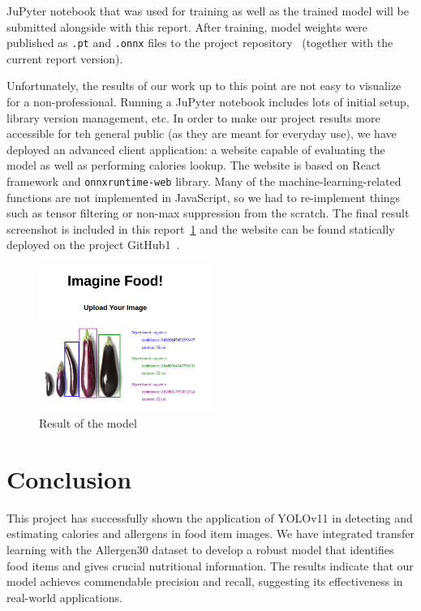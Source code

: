 \documentclass[10pt,twocolumn,letterpaper]{article}
\begin{document}
JuPyter notebook that was used for training as well as the trained model will be submitted alongside with this report.
After training, model weights were published as \texttt{.pt} and \texttt{.onnx} files to the project repository~\cite{projectRepo} (together with the current report version).

Unfortunately, the results of our work up to this point are not easy to visualize for a non-professional.
Running a JuPyter notebook includes lots of initial setup, library version management, etc.
In order to make our project results more accessible for teh general public (as they are meant for everyday use), we have deployed an advanced client application: a website capable of evaluating the model as well as performing calories lookup.
The website is based on React framework and \texttt{onnxruntime-web} library.
Many of the machine-learning-related functions are not implemented in JavaScript, so we had to re-implement things such as tensor filtering or non-max suppression from the scratch.
The final result screenshot is included in this report~\ref{advanced-client-result} and the website can be found statically deployed on the project GitHub1~\cite{projectWebsite}.

\begin{figure}[htbp]
    \centering
    \includegraphics[width=0.5\textwidth]{advanced-detector.png}
    \caption{Result of the model}\label{advanced-client-result}
\end{figure}

\section{Conclusion}

This project has successfully shown the application of YOLOv11 in detecting and estimating calories and allergens in food item images. 
We have integrated transfer learning with the Allergen30 dataset to develop a robust model that identifies food items and gives crucial nutritional information. 
The results indicate that our model achieves commendable precision and recall, suggesting its effectiveness in real-world applications.
\end{document}
